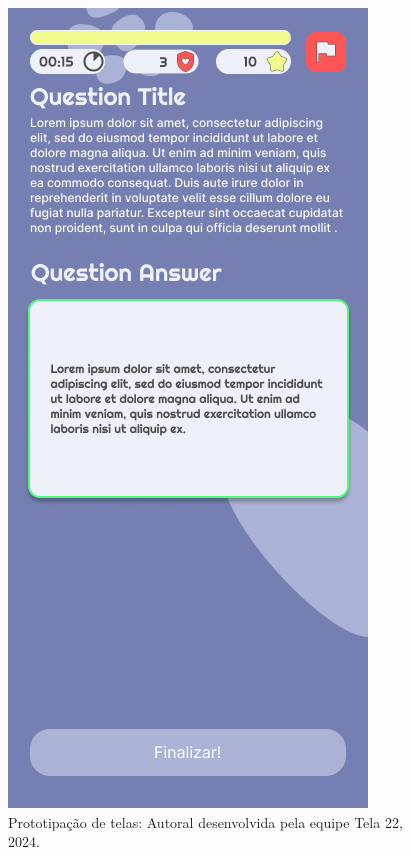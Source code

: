 \documentclass[12pt, openany, oneside, a4paper, english, brazil]{abntex2}   %
\begin{document}
\begin{figure}
    \centering
    \includegraphics[scale=0.7]{figuras/Math.Pow App/Written Question Without Image.png}
    \caption{Prototipação de telas: Autoral desenvolvida pela equipe Tela 22, 2024.}
    \label{fig:nome-da-imagem}
\end{figure}
\end{document}
